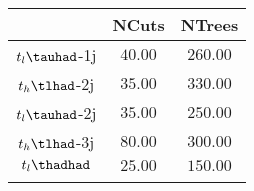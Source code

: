 \centering
\begin{tabular}{ccc} \toprule\toprule
 & NCuts & NTrees\\\midrule
$t_{l}\tauhad$-1j & $40.00$ & $260.00$\\
$t_{h}\tlhad$-2j & $35.00$ & $330.00$\\
$t_{l}\tauhad$-2j & $35.00$ & $250.00$\\
$t_{h}\tlhad$-3j & $80.00$ & $300.00$\\
$t_{l}\thadhad$ & $25.00$ & $150.00$\\
\bottomrule\bottomrule\\
\end{tabular}
